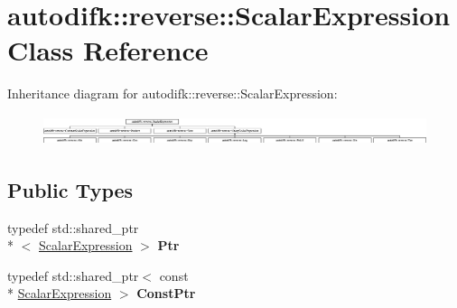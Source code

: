 \hypertarget{classautodifk_1_1reverse_1_1_scalar_expression}{\section{autodifk\-:\-:reverse\-:\-:Scalar\-Expression Class Reference}
\label{classautodifk_1_1reverse_1_1_scalar_expression}
}
Inheritance diagram for autodifk\-:\-:reverse\-:\-:Scalar\-Expression\-:\begin{figure}[H]
\begin{center}
\leavevmode
\includegraphics[height=0.895522cm]{classautodifk_1_1reverse_1_1_scalar_expression}
\end{center}
\end{figure}
\subsection*{Public Types}
\begin{DoxyCompactItemize}
\item 
\hypertarget{classautodifk_1_1reverse_1_1_scalar_expression_a99942f407a198eb41cd3229c0a2b8dc3}{typedef std\-::shared\-\_\-ptr\\*
$<$ \hyperlink{classautodifk_1_1reverse_1_1_scalar_expression}{Scalar\-Expression} $>$ {\bfseries Ptr}}\label{classautodifk_1_1reverse_1_1_scalar_expression_a99942f407a198eb41cd3229c0a2b8dc3}

\item 
\hypertarget{classautodifk_1_1reverse_1_1_scalar_expression_a698d78b9940e968e633a026ee1ef14ec}{typedef std\-::shared\-\_\-ptr$<$ const \\*
\hyperlink{classautodifk_1_1reverse_1_1_scalar_expression}{Scalar\-Expression} $>$ {\bfseries Const\-Ptr}}\label{classautodifk_1_1reverse_1_1_scalar_expression_a698d78b9940e968e633a026ee1ef14ec}

\end{DoxyCompactItemize}
